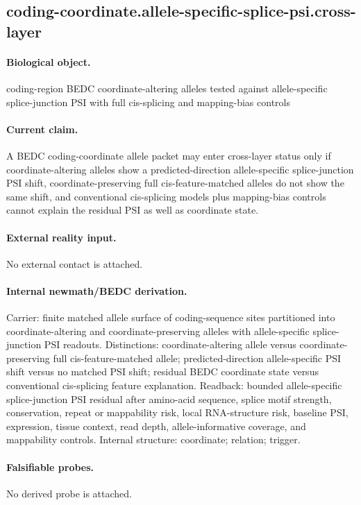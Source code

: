 \subsection{coding-coordinate.allele-specific-splice-psi.cross-layer}

\paragraph{Biological object.} coding-region BEDC coordinate-altering alleles tested against allele-specific splice-junction PSI with full cis-splicing and mapping-bias controls

\paragraph{Current claim.} A BEDC coding-coordinate allele packet may enter cross-layer status only if coordinate-altering alleles show a predicted-direction allele-specific splice-junction PSI shift, coordinate-preserving full cis-feature-matched alleles do not show the same shift, and conventional cis-splicing models plus mapping-bias controls cannot explain the residual PSI as well as coordinate state.

\paragraph{External reality input.}
No external contact is attached.

\paragraph{Internal newmath/BEDC derivation.} Carrier: finite matched allele surface of coding-sequence sites partitioned into coordinate-altering and coordinate-preserving alleles with allele-specific splice-junction PSI readouts. Distinctions: coordinate-altering allele versus coordinate-preserving full cis-feature-matched allele; predicted-direction allele-specific PSI shift versus no matched PSI shift; residual BEDC coordinate state versus conventional cis-splicing feature explanation. Readback: bounded allele-specific splice-junction PSI residual after amino-acid sequence, splice motif strength, conservation, repeat or mappability risk, local RNA-structure risk, baseline PSI, expression, tissue context, read depth, allele-informative coverage, and mappability controls. Internal structure: coordinate; relation; trigger.

\paragraph{Falsifiable probes.}
No derived probe is attached.

